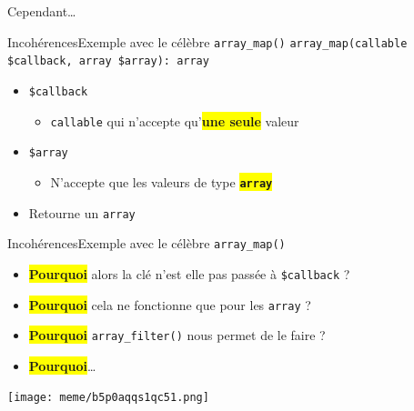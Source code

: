 \begin{frameC}{Cependant\ldots}

\end{frameC}

\begin{frame}{Incohérences}{Exemple avec le célèbre \texttt{array\_map()}}
    \texttt{array\_map(callable \$callback, array \$array): array}

    \pause

    \begin{itemize}[<+->]
        \item \texttt{\$callback}

        \begin{itemize}[<+->]
            \item \texttt{callable} qui n'accepte qu'\colorbox{yellow}{\textbf{une seule}} valeur
        \end{itemize}

        \item \texttt{\$array}

        \begin{itemize}[<+->]
            \item N'accepte que les valeurs de type \colorbox{yellow}{\texttt{\textbf{array}}}
        \end{itemize}

        \item Retourne un \texttt{array}
    \end{itemize}

\end{frame}

\begin{frame}{Incohérences}{Exemple avec le célèbre \texttt{array\_map()}}
    \begin{itemize}[<+->]
        \item \colorbox{yellow}{\textbf{Pourquoi}} alors la clé n'est elle pas passée à \texttt{\$callback} ?
        \item \colorbox{yellow}{\textbf{Pourquoi}} cela ne fonctionne que pour les \texttt{array} ?
        \item \colorbox{yellow}{\textbf{Pourquoi}} \texttt{array\_filter()} nous permet de le faire ?
        \item \colorbox{yellow}{\textbf{Pourquoi}}\ldots
    \end{itemize}
\end{frame}

\begin{frame}
    \begin{center}
        \texttt{[image: meme/b5p0aqqs1qc51.png]}
    \end{center}
\end{frame}

